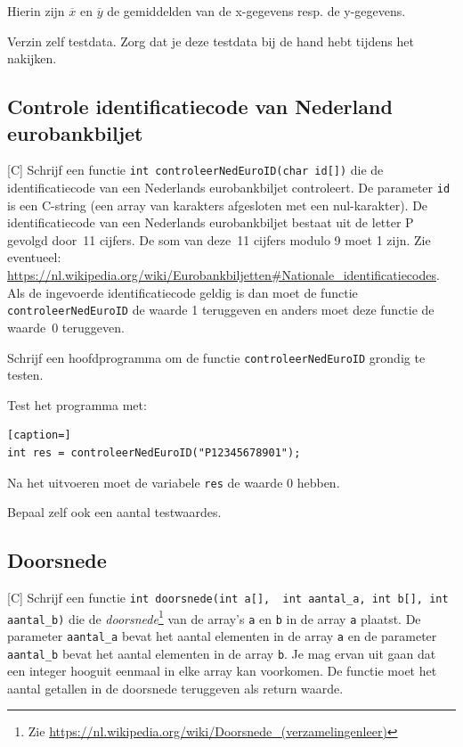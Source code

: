 \documentclass[a4paper,10pt,fleqn,twoside]{article}
\begin{document}
Hierin zijn $\overline{x}$ en $\overline{y}$ de gemiddelden van de x-gegevens resp. de y-gegevens.

Verzin zelf testdata. Zorg dat je deze testdata bij de hand hebt tijdens het nakijken.

\subsection{Controle identificatiecode van Nederland eurobankbiljet}[C]
Schrijf een functie \lstinline|int controleerNedEuroID(char id[])| die de identificatiecode van een Nederlands eurobankbiljet controleert. De parameter \lstinline|id| is een C-string (een array van karakters afgesloten met een nul-karakter). De identificatiecode van een Nederlands eurobankbiljet bestaat uit de letter P gevolgd door~11 cijfers. De som van deze~11 cijfers modulo 9 moet 1 zijn. Zie eventueel: \url{https://nl.wikipedia.org/wiki/Eurobankbiljetten#Nationale_identificatiecodes}. Als de ingevoerde identificatiecode geldig is dan moet de functie \lstinline|controleerNedEuroID| de waarde 1 teruggeven en anders moet deze functie de waarde~0 teruggeven.

Schrijf een hoofdprogramma om de functie \lstinline|controleerNedEuroID| grondig te testen.

Test het programma met:

\begin{lstlisting}[caption=]
int res = controleerNedEuroID("P12345678901");
\end{lstlisting}

Na het uitvoeren moet de variabele \lstinline|res| de waarde 0 hebben.

Bepaal zelf ook een aantal testwaardes.

\subsection{Doorsnede}[C]
Schrijf een functie \mbox{\lstinline[columns=fixed]|int doorsnede(int a[],  int aantal_a, int b[], int aantal_b)|} die de \textsl{doorsnede}\footnote{Zie \url{https://nl.wikipedia.org/wiki/Doorsnede_(verzamelingenleer)}} van de array’s \lstinline|a| en \lstinline|b| in de array \lstinline|a| plaatst. De parameter \lstinline|aantal_a| bevat het aantal elementen in de array \lstinline|a| en de parameter \lstinline|aantal_b| bevat het aantal elementen in de array \lstinline|b|. Je mag ervan uit gaan dat een integer hooguit eenmaal in elke array kan voorkomen. De functie moet het aantal getallen in de doorsnede teruggeven als return waarde. 
\end{document}
